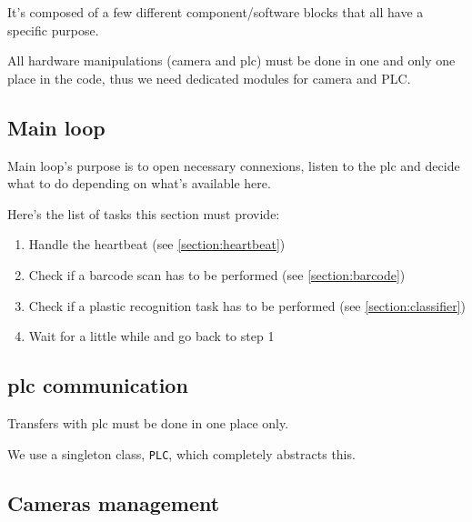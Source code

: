 It's composed of a few different component/software blocks that all have a specific purpose.

All hardware manipulations (camera and \gls{plc}) must be done in one and only one place in the code,
thus we need dedicated modules for camera and PLC.


\subsection{Main loop}

Main loop's purpose is to open necessary connexions, listen to the \gls{plc} and decide what to do depending on what's available here.

Here's the list of tasks this section must provide:

\begin{enumerate}
    \item Handle the \gls{heartbeat} (see \ref{section:heartbeat})
    \item Check if a barcode scan has to be performed (see \ref{section:barcode})
    \item Check if a plastic recognition task has to be performed (see \ref{section:classifier})
    \item Wait for a little while and go back to step 1
\end{enumerate}

\subsection{\gls{plc} communication}

Transfers with \gls{plc} must be done in one place only.

We use a singleton class, \texttt{PLC}, which completely abstracts this.


\subsection{Cameras management}

